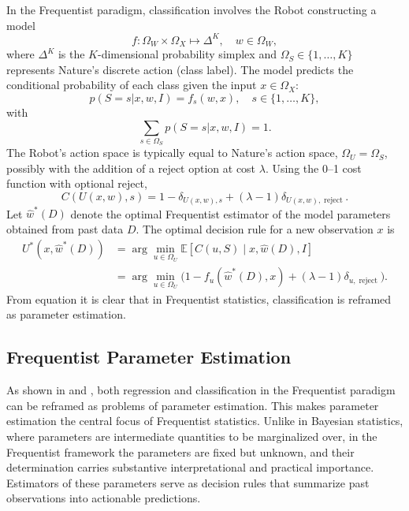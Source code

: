 In the Frequentist paradigm, classification involves the Robot constructing a model
\begin{equation}
	f: \Omega_W \times \Omega_X \mapsto \Delta^K, \quad w \in \Omega_W,
\end{equation}
where $\Delta^K$ is the $K$-dimensional probability simplex and $\Omega_S \in \{1,\dots,K\}$ represents Nature's discrete action (class label). The model predicts the conditional probability of each class given the input $x \in \Omega_X$:
\begin{equation}
	p(S = s | x, w, I) = f_s(w, x), \quad s \in \{1,\dots,K\},
\end{equation}
with
\begin{equation}
	\sum_{s\in \Omega_S} p(S = s | x, w, I) = 1.
\end{equation}
The Robot's action space is typically equal to Nature's action space, $\Omega_U = \Omega_S$, possibly with the addition of a reject option at cost $\lambda$. Using the 0--1 cost function with optional reject,
\begin{equation}
	C(U(x,w), s) = 1 - \delta_{U(x,w),s} + (\lambda-1)\delta_{U(x,w), \operatorname{reject}}.
\end{equation}
Let $\hat{w}^*(D)$ denote the optimal Frequentist estimator of the model parameters obtained from past data $D$. The optimal decision rule for a new observation $x$ is
\begin{equation}
	\begin{split}
		U^*(x, \hat{w}^*(D)) &= \arg\min_{u \in \Omega_U} \mathbb{E}[C(u, S) \mid x, \hat{w}(D), I] \\
		&= \arg\min_{u \in \Omega_U} \Big(1 - f_{u}(\hat{w}^*(D), x) + (\lambda-1)\delta_{u, \operatorname{reject}}\Big).
	\end{split}
	\label{freq:decision_classification}
\end{equation}
From equation  it is clear that in Frequentist statistics, classification is reframed as parameter estimation.


\subsection{Frequentist Parameter Estimation}
\label{chp:frequentist_parameter_estimation}
As shown in  and , both regression and classification in the Frequentist paradigm can be reframed as problems of parameter estimation. This makes parameter estimation the central focus of Frequentist statistics. Unlike in Bayesian statistics, where parameters are intermediate quantities to be marginalized over, in the Frequentist framework the parameters are fixed but unknown, and their determination carries substantive interpretational and practical importance. Estimators of these parameters serve as decision rules that summarize past observations into actionable predictions.

